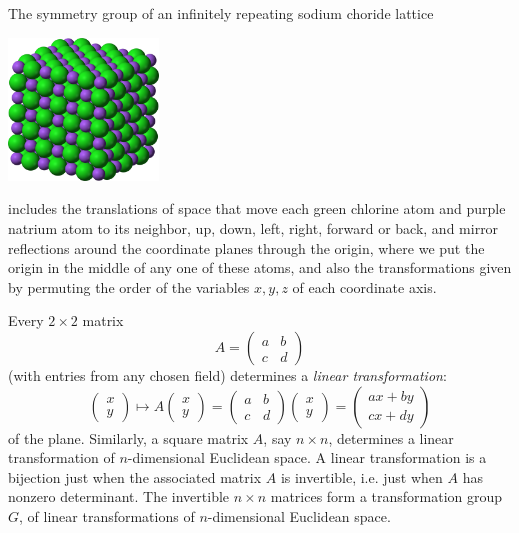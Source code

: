 \begin{example}
The symmetry group of an infinitely repeating sodium choride lattice
\begin{center}
\includegraphics[width=4cm]{Sodium-chloride-3D-ionic.png}
\end{center}
includes the translations of space that move each green chlorine atom and purple natrium atom to its neighbor, up, down, left, right, forward or back, and mirror reflections around the coordinate planes through the origin, where we put the origin in the middle of any one of these atoms, and also the transformations given by permuting the order of the variables \(x,y,z\) of each coordinate axis.
\end{example}
\begin{example}
Every \(2 \times 2\) matrix 
\[
A=
\begin{pmatrix}
a & b \\
c & d
\end{pmatrix}
\]
(with entries from any chosen field) determines a \emph{linear transformation}:
\[
\begin{pmatrix}
x \\
y
\end{pmatrix}
\mapsto
A
\begin{pmatrix}
x \\
y
\end{pmatrix}
=
\begin{pmatrix}
a & b \\
c & d
\end{pmatrix}
\begin{pmatrix}
x \\
y
\end{pmatrix}
=
\begin{pmatrix}
ax + by \\
cx + dy
\end{pmatrix}
\]
of the plane.
Similarly, a square matrix \(A\), say \(n \times n\), determines a linear transformation of \(n\)-dimensional Euclidean space.
A linear transformation is a bijection just when the associated matrix \(A\) is invertible, i.e. just when \(A\) has nonzero determinant.
The invertible \(n \times n\) matrices form a transformation group \(G\), of linear transformations of \(n\)-dimensional Euclidean space.
\end{example}
